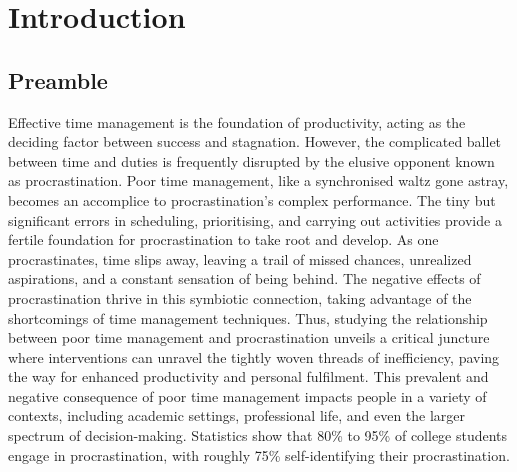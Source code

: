 \documentclass{l4proj}
\begin{document}
\chapter{Introduction}

\section{Preamble}
Effective time management is the foundation of productivity, acting as the deciding factor between success and stagnation. However, the complicated ballet between time and duties is frequently disrupted by the elusive opponent known as procrastination. Poor time management, like a synchronised waltz gone astray, becomes an accomplice to procrastination's complex performance. The tiny but significant errors in scheduling, prioritising, and carrying out activities provide a fertile foundation for procrastination to take root and develop. As one procrastinates, time slips away, leaving a trail of missed chances, unrealized aspirations, and a constant sensation of being behind. The negative effects of procrastination thrive in this symbiotic connection, taking advantage of the shortcomings of time management techniques. Thus, studying the relationship between poor time management and procrastination unveils a critical juncture where interventions can unravel the tightly woven threads of inefficiency, paving the way for enhanced productivity and personal fulfilment. This prevalent and negative consequence of poor time management impacts people in a variety of contexts, including academic settings, professional life, and even the larger spectrum of decision-making. Statistics show that  80\% to 95\% of college students engage in procrastination, with roughly 75\% self-identifying their procrastination. \cite{steel2007nature}
\\
\end{document}
